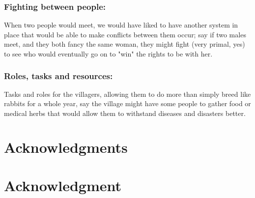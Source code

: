 \documentclass[conference,compsoc]{IEEEtran}
\begin{document}
\subsubsection*{Fighting between people:}
When two people would meet, we would have liked to have another system in place that would be able to make conflicts between them occur; say if two males meet, and they both fancy the same woman, they might fight (very primal, yes) to see who would eventually go on to "win" the rights to be with her.\\

\subsubsection*{Roles, tasks and resources:}
Tasks and roles for the villagers, allowing them to do more than simply breed like rabbits for a whole year, say the village might have some people to gather food or medical herbs that would allow them to withstand diseases and disasters better.\\


\newpage

\nocite{*} %
 


\ifCLASSOPTIONcompsoc
  \section*{Acknowledgments}
\else
  \section*{Acknowledgment}
\fi
\end{document}
